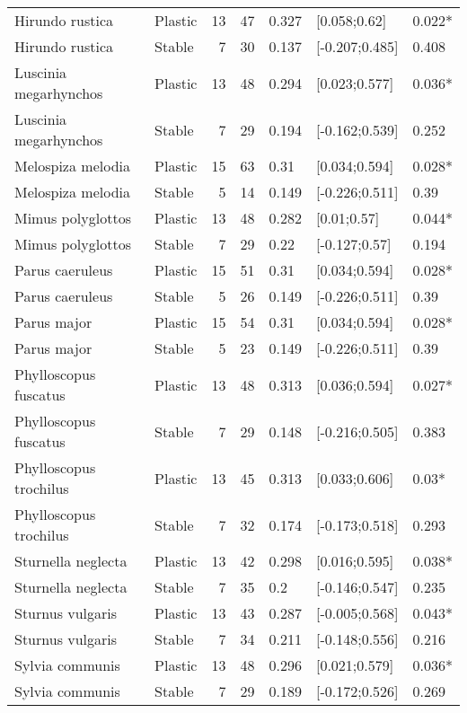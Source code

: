 \documentclass{article}
\begin{document}
\begin{table}[H]
\begin{tabular}{llrrlll}
  Hirundo rustica & Plastic & 13 & 47 & 0.327 & [0.058;0.62] & 0.022* \\ 
  Hirundo rustica & Stable & 7 & 30 & 0.137 & [-0.207;0.485] & 0.408 \\ 
  Luscinia megarhynchos & Plastic & 13 & 48 & 0.294 & [0.023;0.577] & 0.036* \\ 
  Luscinia megarhynchos & Stable & 7 & 29 & 0.194 & [-0.162;0.539] & 0.252 \\ 
  Melospiza melodia & Plastic & 15 & 63 & 0.31 & [0.034;0.594] & 0.028* \\ 
  Melospiza melodia & Stable & 5 & 14 & 0.149 & [-0.226;0.511] & 0.39 \\ 
  Mimus polyglottos & Plastic & 13 & 48 & 0.282 & [0.01;0.57] & 0.044* \\ 
  Mimus polyglottos & Stable & 7 & 29 & 0.22 & [-0.127;0.57] & 0.194 \\ 
  Parus caeruleus & Plastic & 15 & 51 & 0.31 & [0.034;0.594] & 0.028* \\ 
  Parus caeruleus & Stable & 5 & 26 & 0.149 & [-0.226;0.511] & 0.39 \\ 
  Parus major & Plastic & 15 & 54 & 0.31 & [0.034;0.594] & 0.028* \\ 
  Parus major & Stable & 5 & 23 & 0.149 & [-0.226;0.511] & 0.39 \\ 
  Phylloscopus fuscatus & Plastic & 13 & 48 & 0.313 & [0.036;0.594] & 0.027* \\ 
  Phylloscopus fuscatus & Stable & 7 & 29 & 0.148 & [-0.216;0.505] & 0.383 \\ 
  Phylloscopus trochilus & Plastic & 13 & 45 & 0.313 & [0.033;0.606] & 0.03* \\ 
  Phylloscopus trochilus & Stable & 7 & 32 & 0.174 & [-0.173;0.518] & 0.293 \\ 
  Sturnella neglecta & Plastic & 13 & 42 & 0.298 & [0.016;0.595] & 0.038* \\ 
  Sturnella neglecta & Stable & 7 & 35 & 0.2 & [-0.146;0.547] & 0.235 \\ 
  Sturnus vulgaris & Plastic & 13 & 43 & 0.287 & [-0.005;0.568] & 0.043* \\ 
  Sturnus vulgaris & Stable & 7 & 34 & 0.211 & [-0.148;0.556] & 0.216 \\ 
  Sylvia communis & Plastic & 13 & 48 & 0.296 & [0.021;0.579] & 0.036* \\ 
  Sylvia communis & Stable & 7 & 29 & 0.189 & [-0.172;0.526] & 0.269 \\ 
  \hline
  \end{tabular}
  \end{table}
  
\end{document}

